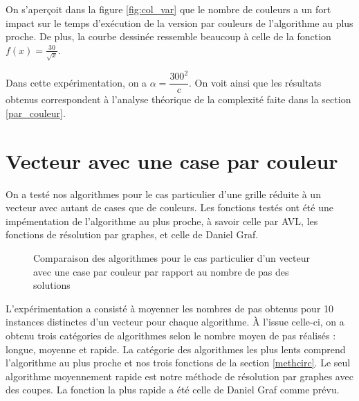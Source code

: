 \documentclass[12pt,a4paper]{article}
\begin{document}
On s'aper\c{c}oit dans la figure \ref{fig:col_var} que le nombre de couleurs a 
un fort impact sur le temps d'ex\'ecution de la version par couleurs de 
l'algorithme au plus proche. De plus, la courbe dessin\'ee ressemble beaucoup 
\`a celle de la fonction $f(x) = \frac{30}{\sqrt x}$.

Dans cette exp\'erimentation, on a $\alpha = \dfrac{300^2}{c}$. On voit ainsi 
que les r\'esultats obtenus correspondent \`a l'analyse th\'eorique de la 
complexit\'e faite dans la section \ref{par_couleur}.

\section{Vecteur avec une case par couleur}
On a test\'e nos algorithmes pour le cas particulier d'une 
grille r\'eduite \`a un vecteur avec autant de cases que de couleurs.
Les fonctions test\'es ont \'et\'e une imp\'ementation de l'algorithme 
au plus proche, \`a savoir celle par AVL, les fonctions de r\'esolution par 
graphes, et celle de Daniel Graf.

\begin{figure}[!h]
\centering
\captionsetup{justification=centering}
\caption[Un vecteur avec une case par couleur]{Comparaison des algorithmes 
pour le cas particulier d'un vecteur avec une case par couleur par rapport au 
nombre de pas des solutions}
\label{fig:vect_1cpc}
\end{figure}

L'exp\'erimentation a consist\'e \`a moyenner les nombres de pas obtenus 
pour 10 instances distinctes d'un vecteur pour chaque algorithme.
\`A l'issue celle-ci, on a obtenu trois cat\'egories de algorithmes selon le 
nombre moyen de pas r\'ealis\'es : longue, moyenne et rapide. La cat\'egorie 
des algorithmes les plus lents comprend l'algorithme au plus proche et nos 
trois fonctions de la section \ref{methcirc}. Le seul algorithme moyennement 
rapide est notre m\'ethode de r\'esolution par graphes avec des coupes. La 
fonction la plus rapide a \'et\'e celle de Daniel Graf comme pr\'evu.
\end{document}
